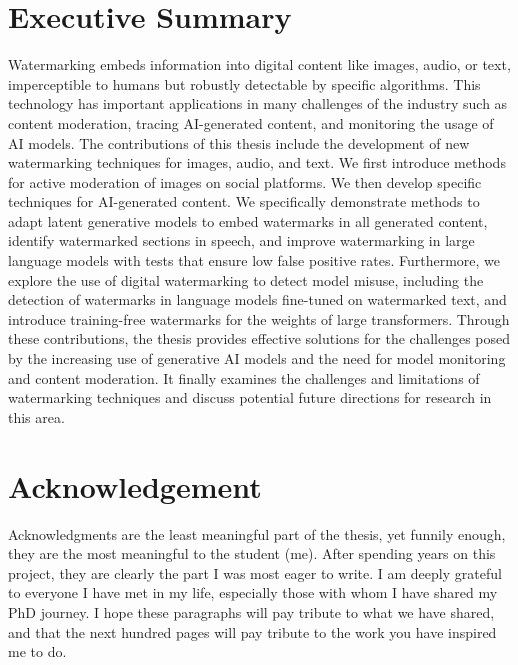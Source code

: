 \chapter*{Executive Summary}

Watermarking embeds information into digital content like images, audio, or text, imperceptible to humans but robustly detectable by specific algorithms.
This technology has important applications in many challenges of the industry such as content moderation, tracing AI-generated content, and monitoring the usage of AI models.
The contributions of this thesis include the development of new watermarking techniques for images, audio, and text. 
We first introduce methods for active moderation of images on social platforms. 
We then develop specific techniques for AI-generated content.
We specifically demonstrate methods to adapt latent generative models to embed watermarks in all generated content, identify watermarked sections in speech, and improve watermarking in large language models with tests that ensure low false positive rates.
Furthermore, we explore the use of digital watermarking to detect model misuse, including the detection of watermarks in language models fine-tuned on watermarked text, and introduce training-free watermarks for the weights of large transformers.
Through these contributions, the thesis provides effective solutions for the challenges posed by the increasing use of generative AI models and the need for model monitoring and content moderation.
It finally examines the challenges and limitations of watermarking techniques and discuss potential future directions for research in this area.


\chapter*{Acknowledgement}

Acknowledgments are the least meaningful part of the thesis, yet funnily enough, they are the most meaningful to the student (me). 
After spending years on this project, they are clearly the part I was most eager to write.
I am deeply grateful to everyone I have met in my life, especially those with whom I have shared my PhD journey. 
I hope these paragraphs will pay tribute to what we have shared, and that the next hundred pages will pay tribute to the work you have inspired me to do.

